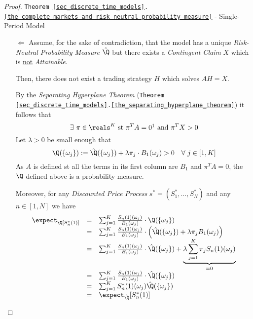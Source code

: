 \documentclass[11pt,a4paper]{article}
\begin{document}
\begin{proof}{\texttt{Theorem \ref{sec_discrete_time_models}.\ref{the_complete_markets_and_risk_neutral_probability_measure}} - Single-Period Model}
\begin{itemize}
\[\begin{array}{rcl}
        &=&\expect_{\hat\Q}[X/B_1]=\expect_{\hat\Q}[V_0]\\
        \implies\ \expect_\Q[V_0]&\neq&\expect_{\hat\Q}[V_0]
      \end{array}\]
      This contradicts \texttt{Proof \ref{sec_discrete_time_models}.\ref{prf_risk_neutral_valuation_principle_single_period}}  when we showed that if $X$ is attainable then $\expect_\Q[V_0]$ is the same for all $\Q\in\mathbb{M}$.
      \par Thus, if the model is \textit{Complete} then it has a unique \textit{Risk-Neutral Probability Measure}.
      \item[$\Longleftarrow$] Assume, for the sake of contradiction, that the model has a unique \textit{Risk-Neutral Probability Measure} $\hat\Q$ but there exists a \textit{Contingent Claim} $X$ which is \underline{not} \textit{Attainable}.
      \par Then, there does not exist a trading strategy $H$ which solves $AH=X$.
      \par By the \textit{Separating Hyperplane Theorem} (\texttt{Theorem \ref{sec_discrete_time_models}.\ref{the_separating_hyperplane_theorem}}) it follows that
      \[ \exists\ \pi\in\reals^K\text{ st }\pi^TA=0\footnotemark\text{ and }\pi^TX>0 \]
      Let $\lambda>0$ be small enough that
      \[ \Q(\{\omega_j\}):=\hat\Q(\{\omega_j\})+\lambda\pi_j\cdot B_1(\omega_j)>0\quad\forall\ j\in[1,K] \]
      As $A$ is defined st all the terms in its first column are $B_1$ and $\pi^TA=0$, the $\Q$ defined above is a probability measure.
      \par Moreover, for any \textit{Discounted Price Process} $s^*=(S_1^*,\dots,S_N^*)$ and any $n\in[1,N]$ we have
      \[\begin{array}{rcl}
        \expect_\Q[S_n^*(1)]&=&\sum_{j=1}^K\frac{S_n(1)(\omega_j)}{B_1(\omega_j)}\cdot\Q(\{\omega_j\})\\
        &=&\sum_{j=1}^K\frac{S_n(1)(\omega_j)}{B_1(\omega_j)}\cdot\left(\hat\Q(\{\omega_j\})+\lambda\pi_jB_1(\omega_j)\right)\\
        &=&\sum_{j=1}^K\frac{S_n(1)(\omega_j)}{B_1(\omega_j)}\cdot\hat\Q(\{\omega_j\})+\underbrace{\lambda\sum_{j=1}^K\pi_jS_n(1)(\omega_j)}_{=0}\\
        &=&\sum_{j=1}^K\frac{S_n(1)(\omega_j)}{B_1(\omega_j)}\cdot\hat\Q(\{\omega_j\})\\
        &=&\sum_{j=1}^KS_n^*(1)(\omega_j)\hat\Q(\{\omega_j\})\\
        &=&\expect_{\hat\Q}[S_n^*(1)]\\

\end{array}\]
\end{itemize}
\end{proof}
\end{document}
